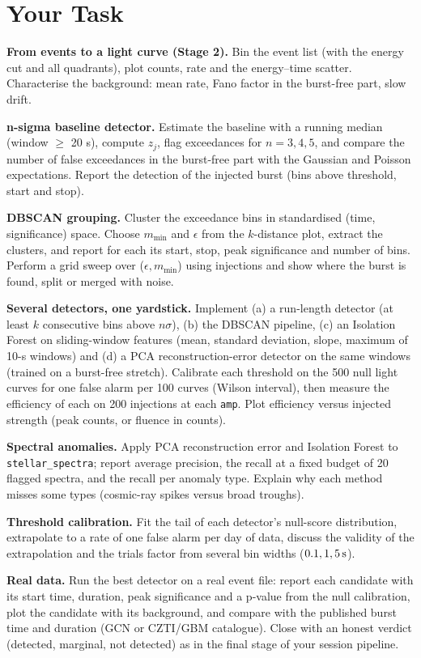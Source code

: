 \documentclass[11pt,a4paper]{article}
\begin{document}
\section*{Your Task}
\begin{tasks}
  \item \textbf{From events to a light curve (Stage 2).} Bin the event list (with the energy cut and all quadrants), plot counts, rate and the energy--time scatter. Characterise the background: mean rate, Fano factor in the burst-free part, slow drift.
  \item \textbf{n-sigma baseline detector.} Estimate the baseline with a running median (window $\ge$ 20 s), compute $z_j$, flag exceedances for $n=3,4,5$, and compare the number of false exceedances in the burst-free part with the Gaussian and Poisson expectations. Report the detection of the injected burst (bins above threshold, start and stop).
  \item \textbf{DBSCAN grouping.} Cluster the exceedance bins in standardised (time, significance) space. Choose $m_{\min}$ and $\epsilon$ from the $k$-distance plot, extract the clusters, and report for each its start, stop, peak significance and number of bins. Perform a grid sweep over ($\epsilon,m_{\min}$) using injections and show where the burst is found, split or merged with noise.
  \item \textbf{Several detectors, one yardstick.} Implement (a) a run-length detector (at least $k$ consecutive bins above $n\sigma$), (b) the DBSCAN pipeline, (c) an Isolation Forest on sliding-window features (mean, standard deviation, slope, maximum of 10-s windows) and (d) a PCA reconstruction-error detector on the same windows (trained on a burst-free stretch). Calibrate each threshold on the 500 null light curves for one false alarm per 100 curves (Wilson interval), then measure the efficiency of each on 200 injections at each \texttt{amp}. Plot efficiency versus injected strength (peak counts, or fluence in counts).
  \item \textbf{Spectral anomalies.} Apply PCA reconstruction error and Isolation Forest to \texttt{stellar\_spectra}; report average precision, the recall at a fixed budget of 20 flagged spectra, and the recall per anomaly type. Explain why each method misses some types (cosmic-ray spikes versus broad troughs).
  \item \textbf{Threshold calibration.} Fit the tail of each detector's null-score distribution, extrapolate to a rate of one false alarm per day of data, discuss the validity of the extrapolation and the trials factor from several bin widths ($0.1,1,\SI{5}{\second}$).
  \item \textbf{Real data.} Run the best detector on a real event file: report each candidate with its start time, duration, peak significance and a p-value from the null calibration, plot the candidate with its background, and compare with the published burst time and duration (GCN or CZTI/GBM catalogue). Close with an honest verdict (detected, marginal, not detected) as in the final stage of your session pipeline.
\end{tasks}
\end{document}
